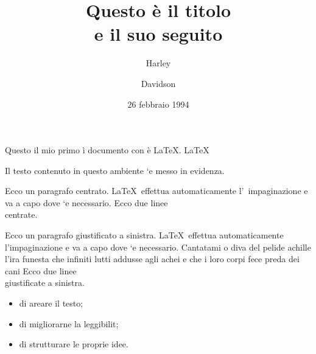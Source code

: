 \documentclass[a4paper,11pt]{article}
\title{Questo  \`{e} il titolo \\ e il suo seguito}
\author{Harley \and Davidson}
\date{26 febbraio 1994}
\begin{document}
\maketitle
Questo il 
mio primo \`{i} documento con \`{e}  \LaTeX.
\LaTeX{}
\begin{em}
	Il testo contenuto in questo ambiente `e messo in evidenza.
\end{em}

\begin{center}
	Ecco un paragrafo centrato. \LaTeX\ effettua
	automaticamente l'~impaginazione e va a capo
	dove `e necessario.
	Ecco due linee \\ centrate.
\end{center}

\begin{flushleft}
	Ecco un paragrafo giustificato a sinistra. \LaTeX\
	effettua automaticamente l'impaginazione e va a capo
	dove `e necessario.
	Cantatami o diva del pelide achille l'ira funesta che infiniti lutti addusse agli achei e che i loro corpi fece preda dei cani
	Ecco due linee \\
	giustificate a sinistra.
\end{flushleft}

\begin{itemize}
	\item di areare il testo;
	\item di migliorarne la leggibilit;
	\item di strutturare le proprie idee.
\end{itemize}
\end{document}
